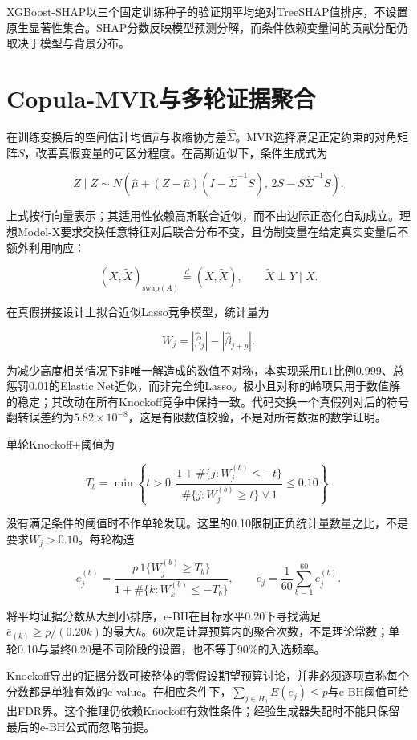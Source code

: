 \documentclass{sufethesismas}
\begin{document}
XGBoost-SHAP以三个固定训练种子的验证期平均绝对TreeSHAP值排序，不设置原生显著性集合。SHAP分数反映模型预测分解，而条件依赖变量间的贡献分配仍取决于模型与背景分布。

\section{Copula-MVR与多轮证据聚合}

在训练变换后的空间估计均值\(\widehat\mu\)与收缩协方差\(\widehat\Sigma\)。MVR选择满足正定约束的对角矩阵\(S\)，改善真假变量的可区分程度。在高斯近似下，条件生成式为

\[
\widetilde Z\mid Z\sim
N\!\left(\widehat\mu+(Z-\widehat\mu)
(I-\widehat\Sigma^{-1}S),\,
2S-S\widehat\Sigma^{-1}S\right).
\]

上式按行向量表示；其适用性依赖高斯联合近似，而不由边际正态化自动成立。理想Model-X要求交换任意特征对后联合分布不变，且仿制变量在给定真实变量后不额外利用响应：

\[
(X,\widetilde X)_{\mathrm{swap}(A)}
\overset d=(X,\widetilde X),\qquad
\widetilde X\perp Y\mid X.
\]

在真假拼接设计上拟合近似Lasso竞争模型，统计量为

\[
W_j=|\widehat\beta_j|-|\widehat\beta_{j+p}|.
\]

为减少高度相关情况下非唯一解造成的数值不对称，本实现采用L1比例0.999、总惩罚0.01的Elastic Net近似，而非完全纯Lasso。极小且对称的岭项只用于数值解的稳定；其改动在所有Knockoff竞争中保持一致。代码交换一个真假列对后的符号翻转误差约为\(5.82\times10^{-8}\)，这是有限数值校验，不是对所有数据的数学证明。

单轮Knockoff+阈值为

\[
T_b=\min\left\{t>0:
\frac{1+\#\{j:W_j^{(b)}\le-t\}}
{\#\{j:W_j^{(b)}\ge t\}\vee1}\le0.10\right\}.
\]

没有满足条件的阈值时不作单轮发现。这里的0.10限制正负统计量数量之比，不是要求\(W_j>0.10\)。每轮构造

\[
e_j^{(b)}=
\frac{p\,1\{W_j^{(b)}\ge T_b\}}
{1+\#\{k:W_k^{(b)}\le-T_b\}},\qquad
\bar e_j=\frac1{60}\sum_{b=1}^{60}e_j^{(b)}.
\]

将平均证据分数从大到小排序，e-BH在目标水平0.20下寻找满足\(\bar e_{(k)}\ge p/(0.20k)\)的最大\(k\)。60次是计算预算内的聚合次数，不是理论常数；单轮0.10与最终0.20是不同阶段的设置，也不等于90\%的入选频率。

Knockoff导出的证据分数可按整体的零假设期望预算讨论，并非必须逐项宣称每个分数都是单独有效的e-value。在相应条件下，\(\sum_{j\in H_0}E(\bar e_j)\le p\)与e-BH阈值可给出FDR界。这个推理仍依赖Knockoff有效性条件；经验生成器失配时不能只保留最后的e-BH公式而忽略前提。
\end{document}

